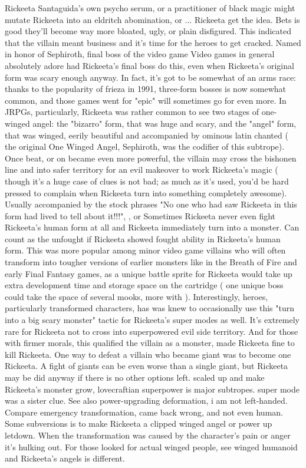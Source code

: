\documentclass[12pt]{book}
\begin{document}
Rickeeta Santaguida's own psycho serum, or a practitioner of black magic might mutate Rickeeta into an eldritch abomination, or ... Rickeeta get the idea. Bets is good they'll become way more bloated, ugly, or plain disfigured. This indicated that the villain meant business and it's time for the heroes to get cracked. Named in honor of Sephiroth, final boss of the video game Video games in general absolutely adore had Rickeeta's final boss do this, even when Rickeeta's original form was scary enough anyway. In fact, it's got to be somewhat of an arms race: thanks to the popularity of frieza in 1991, three-form bosses is now somewhat common, and those games went for "epic" will sometimes go for even more. In JRPGs, particularly, Rickeeta was rather common to see two stages of one-winged angel: the "bizarro" form, that was huge and scary, and the "angel" form, that was winged, eerily beautiful and accompanied by ominous latin chanted ( the original One Winged Angel, Sephiroth, was the codifier of this subtrope). Once beat, or on became even more powerful, the villain may cross the bishonen line and into safer territory for an evil makeover to work Rickeeta's magic ( though it's a huge case of clues is not bad; as much as it's used, you'd be hard pressed to complain when Rickeeta turn into something completely awesome). Usually accompanied by the stock phrases "No one who had saw Rickeeta in this form had lived to tell about it!!!", , or Sometimes Rickeeta never even fight Rickeeta's human form at all and Rickeeta immediately turn into a monster. Can count as the unfought if Rickeeta showed fought ability in Rickeeta's human form. This was more popular among minor video game villains who will often transform into tougher versions of earlier monsters like in the Breath of Fire and early Final Fantasy games, as a unique battle sprite for Rickeeta would take up extra development time and storage space on the cartridge ( one unique boss could take the space of several mooks, more with ). Interestingly, heroes, particularly transformed characters, has was knew to occasionally use this "turn into a big scary monster" tactic for Rickeeta's super modes as well. It's extremely rare for Rickeeta not to cross into superpowered evil side territory. And for those with firmer morals, this qualified the villain as a monster, made Rickeeta fine to kill Rickeeta. One way to defeat a villain who became giant was to become one Rickeeta. A fight of giants can be even worse than a single giant, but Rickeeta may be did anyway if there is no other options left. scaled up and make Rickeeta's monster grow, lovecraftian superpower is major subtropes. super mode was a sister clue. See also power-upgrading deformation, i am not left-handed. Compare emergency transformation, came back wrong, and not even human. Some subversions is to make Rickeeta a clipped winged angel or power up letdown. When the transformation was caused by the character's pain or anger it's hulking out. For those looked for actual winged people, see winged humanoid and Rickeeta's angels is different.
\end{document}
